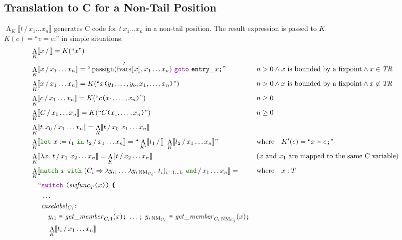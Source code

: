 \documentclass[a4paper,fleqn]{article}
\newcommand{\kwlet}{\mbox{\color{mygreen}\ttfamily let}}
\newcommand{\kwin}{\mbox{\color{mygreen}\ttfamily in}}
\newcommand{\kwmatch}{\mbox{\color{mygreen}\ttfamily match}}
\newcommand{\kwwith}{\mbox{\color{mygreen}\ttfamily with}}
\newcommand{\kwend}{\mbox{\color{mygreen}\ttfamily end}}
\newcommand{\lam}[2]{\lambda #1.~#2}
\newcommand{\lamB}[1]{\lambda #1.~}
\newcommand{\letin}[3]{\kwlet~#1:=#2~\kwin~#3}
\newcommand{\match}[4]{\kwmatch~#1~\kwwith~(#2 \Rightarrow #3)_{#4}~\kwend}
\DeclareMathOperator{\NM}{NM}
\newcommand{\BRA}[1]{\llbracket #1 \rrbracket}
\newcommand{\tr}{\mathit{TR}}
\newcommand{\dq}[1]{\text{``}#1\text{''}}
\newcommand{\ttparen}[1]{\texttt{(}#1\texttt{)}}
\newcommand{\ttlbrace}{\texttt{\{}}
\newcommand{\tteq}{\texttt{=}}
\newcommand{\ttsemi}{\texttt{;}}
\newcommand{\ttcolon}{\texttt{:}}
\newcommand{\kwswitch}{\mbox{\color{myviolet}\ttfamily switch}}
\newcommand{\kwgoto}{\mbox{\color{myviolet}\ttfamily goto}}
\DeclareMathOperator{\passign}{passign}
\DeclareMathOperator{\fvarsop}{fvars}
\newcommand{\fvarsd}[1]{\fvarsop'\BRA{#1}}
\DeclareMathOperator{\Aop}{A}
\newcommand{\A}[3]{\Aop_{#1}\BRA{#2\,/\,#3}}
\begin{document}
\subsection{Translation to C for a Non-Tail Position}\label{sec:AK}
\raggedright
$\A{K}{t}{x_1\dots x_n}$ generates C code for $t~x_1\dots x_n$ in a non-tail position.
The result expression is passed to $K$. \\
$K(e) = \dq{v = e\ttsemi}$ in simple situations.
\begin{align*}
  &\A{K}{x}{} = K(\dq{x}) \\
  &\A{K}{x}{x_1\dots x_n} = \dq{\passign(\fvarsd{x}, x_1 \dots x_n)~\kwgoto~\mathtt{entry\_}x\ttsemi}   && n > 0 \wedge \text{$x$ is bounded by a fixpoint} \wedge x \in \tr \\
  &\A{K}{x}{x_1\dots x_n} = K(\dq{x\ttparen{y_1,\dots,y_o,x_1,\dots, x_n}})                             && n > 0 \wedge \text{$x$ is bounded by a fixpoint} \wedge x \not\in \tr \\
  &\A{K}{c}{x_1\dots x_n} = K(\dq{c\ttparen{x_1,\dots, x_n}})                                   && n \geq 0 \\
  &\A{K}{C}{x_1\dots x_n} = K(\dq{C\ttparen{x_1,\dots, x_n}})                                   && n \geq 0 \\
  &\A{K}{t~x_0}{x_1\dots x_n} = \A{K}{t}{x_0~x_1\dots x_n} \\
  &\A{K}{\letin{x}{t_1}{t_2}}{x_1\dots x_n} = \dq{\A{K'}{t_1}{}~\A{K}{t_2}{x_1\dots x_n}}  && \text{where}\quad K'(e) = \dq{x~\tteq~e\ttsemi} \\
  &\A{K}{\lam{x}{t}}{x_1~x_2\dots x_n} = \A{K}{t}{x_2\dots x_n}                                  && \text{($x$ and $x_1$ are mapped to the same C variable)} \\
  &\A{K}{\match{x}{C_i}{\lambda y_{i1}\dots\lamB{y_{i\NM_{C_i}}}t_i}{i=1\dots h}}{x_1\dots x_n} =  && \text{where}\quad x : T \\
     & \quad\begin{alignedat}{2}
       \text{``} & \kwswitch~\ttparen{\mathit{swfunc}_T\ttparen{x}}~\ttlbrace \\
                 & \dots \\
                 & \mathit{caselabel}_{C_i}\ttcolon \\
                 & \quad y_{i1}~\tteq~\mathit{get\_member}_{C_i1}(x)\ttsemi ~\dots\ttsemi~ y_{i\NM_{C_i}}~\tteq~\mathit{get\_member}_{C_i\NM_{C_i}}(x)\ttsemi \\
                 & \quad \A{K}{t_i}{x_1\dots x_n} \\

\end{alignedat}
\end{align*}
\end{document}
